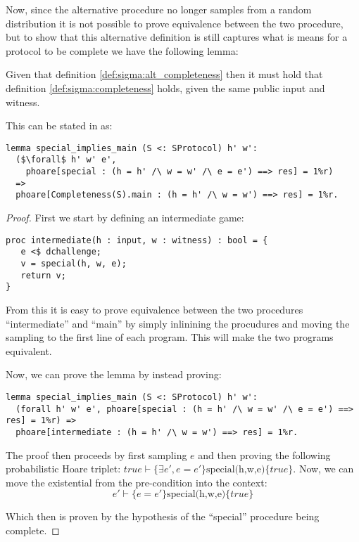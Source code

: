 Now, since the alternative procedure no longer samples from a random
distribution it is not possible to prove equivalence between the two procedure,
but to show that this alternative definition is still captures what is means for
a protocol to be complete we have the following lemma:

\begin{lemma}
Given that definition \ref{def:sigma:alt_completeness} then it must hold that
definition \ref{def:sigma:completeness} holds, given the same public input and witness.

This can be stated in \easycrypt as:
\begin{lstlisting}[mathescape]
lemma special_implies_main (S <: SProtocol) h' w':
  ($\forall$ h' w' e',
    phoare[special : (h = h' /\ w = w' /\ e = e') ==> res] = 1%r)
  =>
  phoare[Completeness(S).main : (h = h' /\ w = w') ==> res] = 1%r.
\end{lstlisting}
\end{lemma}

\begin{proof}
First we start by defining an intermediate game:
\begin{lstlisting}
proc intermediate(h : input, w : witness) : bool = {
   e <$ dchallenge;
   v = special(h, w, e);
   return v;
}
\end{lstlisting}

From this it is easy to prove equivalence between the two procedures
``intermediate'' and ``main'' by simply inlinining the procudures and moving
the sampling to the first line of each program. This will make the two programs
equivalent.

Now, we can prove the lemma by instead proving:
\begin{lstlisting}
lemma special_implies_main (S <: SProtocol) h' w':
  (forall h' w' e', phoare[special : (h = h' /\ w = w' /\ e = e') ==> res] = 1%r) =>
  phoare[intermediate : (h = h' /\ w = w') ==> res] = 1%r.
\end{lstlisting}

The proof then proceeds by first sampling $e$ and then proving the following
probabilistic Hoare triplet: $true \vdash \{\exists e', e = e'\}
\text{special(h,w,e)} \{true\}$. Now, we can move the existential
from the pre-condition into the context:
\[
  e' \vdash \{e = e'\} \text{special(h,w,e)} \{true\}
\]

Which then is proven by the hypothesis of the ``special'' procedure being complete.

\end{proof}



